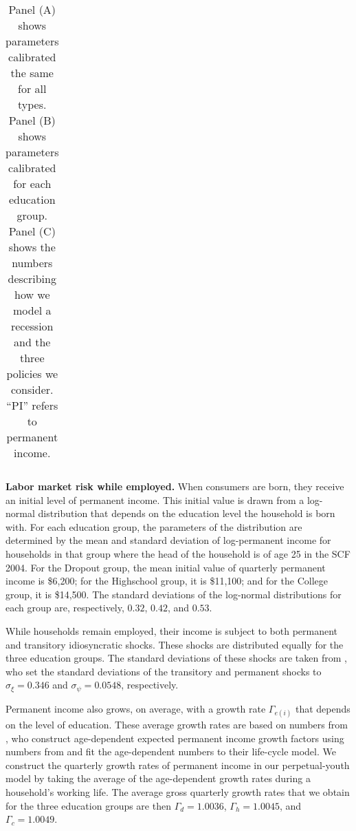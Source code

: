 \documentclass[\econtexRoot/HAFiscal]{subfiles}
\begin{document}
{\begin{table}[p]
\begin{center}
\begin{tabular}{l}
      \end{tabular}
    \end{center}
    \caption{Panel (A) shows parameters calibrated the same for all types. Panel (B) shows parameters calibrated for each education group. Panel (C) shows the numbers describing how we model a recession and the three policies we consider. ``PI'' refers to permanent income.}
    \notinsubfile{\label{tab:calibration}}
  \end{table}
  \clearpage
}

\textbf{Labor market risk while employed.} When consumers are born, they receive an initial level of permanent income. This initial value is drawn from a log-normal distribution that depends on the education level the household is born with. For each education group, the parameters of the distribution are determined by the mean and standard deviation of log-permanent income for households in that group where the head of the household is of age 25 in the SCF 2004. For the Dropout group, the mean initial value of quarterly permanent income is \$6,200; for the Highschool group, it is \$11,100; and for the College group, it is \$14,500. The standard deviations of the log-normal distributions for each group are, respectively, $0.32$, $0.42$, and $0.53$. 

While households remain employed, their income is subject to both permanent and transitory idiosyncratic shocks. These shocks are distributed equally for the three education groups. The standard deviations of these shocks are taken from \cite{carroll2020sticky}, who set the standard deviations of the transitory and permanent shocks to $\sigma_\xi=0.346$ and $\sigma_\psi=0.0548$, respectively. 

Permanent income also grows, on average, with a growth rate $\Gamma_{e(i)}$ that depends on the level of education. These average growth rates are based on numbers from \cite{carroll2020modeling}, who construct age-dependent expected permanent income growth factors using numbers from \cite{cagetti2003wealth} and fit the age-dependent numbers to their life-cycle model. We construct the quarterly growth rates of permanent income in our perpetual-youth model by taking the average of the age-dependent growth rates during a household's working life. The average gross quarterly growth rates that we obtain for the three education groups are then $\Gamma_d=1.0036$, $\Gamma_h=1.0045$, and $\Gamma_c=1.0049$.
\end{document}
